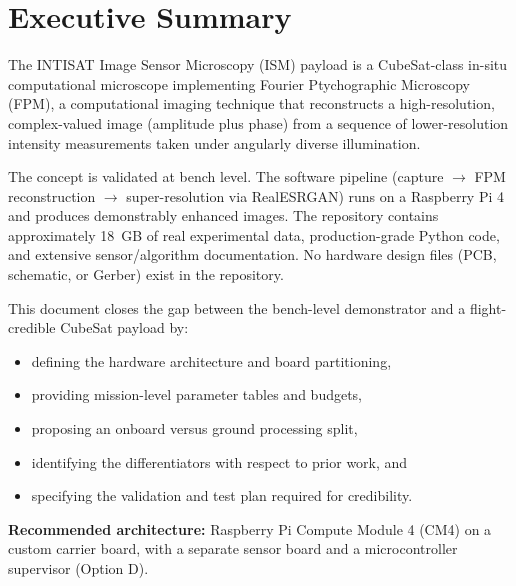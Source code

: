\section{Executive Summary}

The INTISAT Image Sensor Microscopy (ISM) payload is a CubeSat-class in-situ computational microscope implementing Fourier Ptychographic Microscopy (FPM), a computational imaging technique that reconstructs a high-resolution, complex-valued image (amplitude plus phase) from a sequence of lower-resolution intensity measurements taken under angularly diverse illumination.

The concept is validated at bench level. The software pipeline (capture $\rightarrow$ FPM reconstruction $\rightarrow$ super-resolution via RealESRGAN) runs on a Raspberry Pi 4 and produces demonstrably enhanced images. The repository contains approximately 18~GB of real experimental data, production-grade Python code, and extensive sensor/algorithm documentation. No hardware design files (PCB, schematic, or Gerber) exist in the repository.

This document closes the gap between the bench-level demonstrator and a flight-credible CubeSat payload by:
\begin{itemize}[leftmargin=1.5em]
    \item defining the hardware architecture and board partitioning,
    \item providing mission-level parameter tables and budgets,
    \item proposing an onboard versus ground processing split,
    \item identifying the differentiators with respect to prior work, and
    \item specifying the validation and test plan required for credibility.
\end{itemize}

\textbf{Recommended architecture:} Raspberry Pi Compute Module 4 (CM4) on a custom carrier board, with a separate sensor board and a microcontroller supervisor (Option D).
